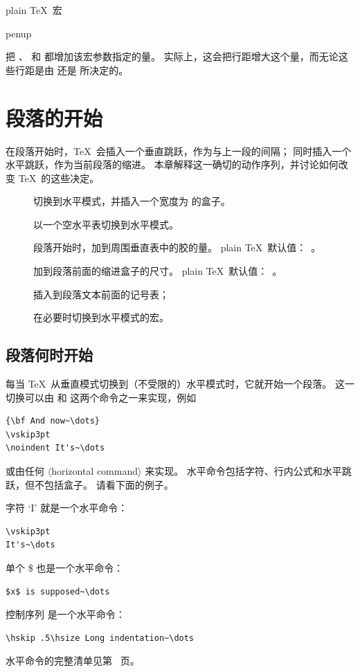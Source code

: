 \documentclass[a4paper]{rapport3}
\makeatletter
\def\gr#1{$\langle$#1$\rangle$}\def\key#1{{\tt#1}}
\def\alt{}\def\altt{}%
\newenvironment{inventory}{\begin{description}}{\end{description}}
\def\gram#1{\gr{#1}}%
\def\cstoidx#1\par{\index{#1@\cs{#1}}}
\def\csidx#1{\cstoidx #1\par\cs{#1}}
\makeatother
\begin{document}
plain \TeX\ 宏 \csidx{openup} 把 、
和  都增加该宏参数指定的量。
实际上，这会把行距增大这个量，而无论这些行距是由 
还是  所决定的。



\endofchapter
\chapter{段落的开始}\label{par:start}

在段落开始时，\TeX\ 会插入一个垂直跳跃，作为与上一段的间隔；
同时插入一个水平跳跃，作为当前段落的缩进。
本章解释这一确切的动作序列，并讨论如何改变 \TeX\ 的这些决定。

\begin{inventory}
\item [] 
      切换到水平模式，并插入一个宽度为  的盒子。

\item []  
      以一个空水平表切换到水平模式。

\item [] 
      段落开始时，加到周围垂直表中的胶的量。
      plain \TeX\ 默认值：~。

\item []  
      加到段落前面的缩进盒子的尺寸。
      plain \TeX\ 默认值：~\n{20pt}。

\item [] 
      插入到段落文本前面的记号表； 

\item [] 
      在必要时切换到水平模式的宏。

\end{inventory}


\section{段落何时开始}

每当 \TeX\ 从垂直模式切换到（不受限的）水平模式时，它就开始一个段落。
这一切换可以由  和  这两个命令之一来实现，例如\begin{verbatim}
{\bf And now~\dots}
\vskip3pt
\noindent It's~\dots
\end{verbatim}
或由任何 \gram{horizontal command} 来实现。
水平命令包括字符、行内公式和水平跳跃，但不包括盒子。
请看下面的例子。
\alt
字符 `I' 就是一个水平命令：
\begin{verbatim}
\vskip3pt
It's~\dots
\end{verbatim}
单个 \n\$ 也是一个水平命令：
\begin{verbatim}
$x$ is supposed~\dots
\end{verbatim} 
控制序列  是一个水平命令：
\begin{verbatim}
\hskip .5\hsize Long indentation~\dots
\end{verbatim}
水平命令的完整清单见第~\pageref{h:com:list} 页。
\end{document}
